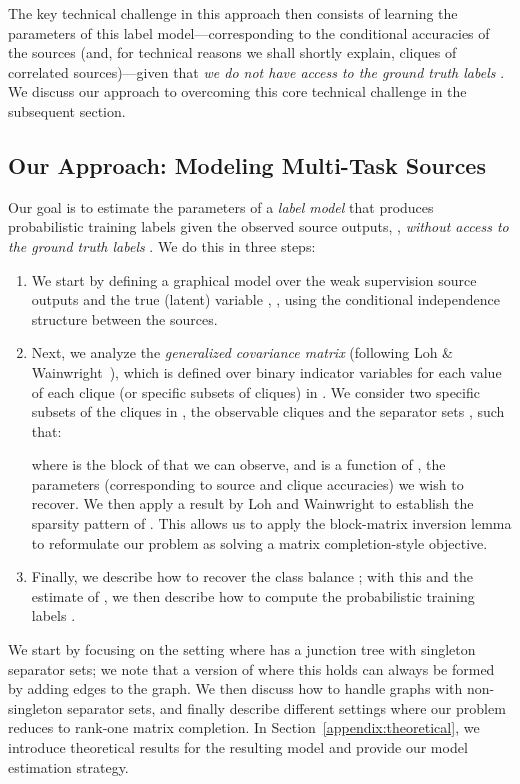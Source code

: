 \documentclass[letterpaper]{article}
\begin{document}
\begin{appendix}
The key technical challenge in this approach then consists of learning the parameters of this label model---corresponding to the conditional accuracies of the sources (and, for technical reasons we shall shortly explain, cliques of correlated sources)---given that \textit{we do not have access to the ground truth labels }.
We discuss our approach to overcoming this core technical challenge in the subsequent section.


\subsection{Our Approach: Modeling Multi-Task Sources}
\label{appendix:modeling-approach-overview}
Our goal is to estimate the parameters  of a \textit{label model} that produces probabilistic training labels given the observed source outputs, , \textit{without access to the ground truth labels }.
We do this in three steps:
\begin{enumerate} 
	\item We start by defining a graphical model over the weak supervision source outputs and the true (latent) variable , , using the conditional independence structure  between the sources.
\item Next, we analyze the \textit{generalized covariance matrix}   (following Loh \& Wainwright~\cite{loh2012structure}), which is defined over binary indicator variables for each value of each clique (or specific subsets of cliques) in .
	We consider two specific subsets of the cliques in , the observable cliques  and the separator sets , such that:
	
	where  is the block of  that we can observe, and  is a function of , the parameters (corresponding to source and  clique accuracies) we wish to recover.
	We then apply a result by Loh and Wainwright \cite{loh2012structure} to establish the sparsity pattern of .
	This allows us to apply the block-matrix inversion lemma to reformulate our problem as solving a matrix completion-style objective.
\item Finally, we describe how to recover the class balance ; with this and the estimate of , we then describe how to compute the probabilistic training labels .
\end{enumerate}

We start by focusing on the setting where  has a junction tree with singleton separator sets; we note that a version of  where this holds can always be formed by adding edges to the graph.
We then discuss how to handle graphs with non-singleton separator sets, and finally describe different settings where our problem reduces to rank-one matrix completion.
In Section~\ref{appendix:theoretical}, we introduce theoretical results for the resulting model and provide our model estimation strategy.


\end{appendix}
\end{document}
